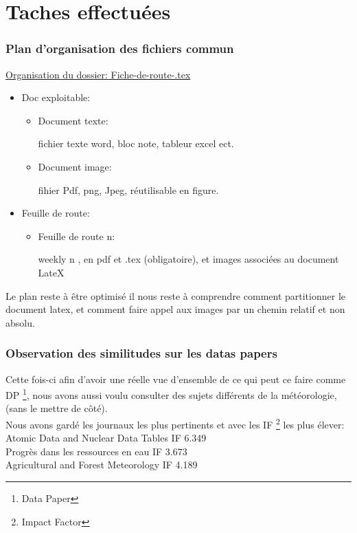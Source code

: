 \documentclass[11pt,oneside]{article}
\begin{document}
\part*{Taches effectuées}
\section*{Plan d'organisation des fichiers commun}

\underline{Organisation du dossier: Fiche-de-route-.tex}
\begin{itemize} [font=\color{airforceblue} \Large, label=, leftmargin=0cm] 
\item  Doc exploitable:	
	\begin{itemize} 
	\item Document texte:
		\begin{description}
		\item[fichier texte word, bloc note, tableur excel ect.]
		\end{description}
	\item Document image:
		\begin{description}
		\item[fihier Pdf, png, Jpeg, réutilisable en figure.]
		\end{description}
	\end{itemize}

\item Feuille de route:
	\begin{itemize}
	\item  Feuille de route n: 
		
		\begin{description}
		\item[  weekly n , en pdf et .tex (obligatoire), 					et 				images associées au document LateX ]
		\end{description}
	
	\end{itemize}
\end{itemize}
Le plan reste à être optimisé il nous reste à comprendre comment 
partitionner le document latex, et comment faire 
appel aux images par un chemin relatif et non absolu.
\newpage
\section*{Observation des similitudes sur les datas papers}
Cette fois-ci afin d'avoir une réelle vue d'ensemble de ce qui peut ce faire comme DP \footnote{Data Paper}, nous avons aussi voulu consulter des sujets
 différents de la météorologie, (sans le mettre de côté).\\
Nous avons gardé les journaux les plus pertinents et avec les IF \footnote{Impact Factor} les plus élever:\\
Atomic Data and Nuclear Data Tables IF 6.349\\
Progrès dans les ressources en eau  IF 3.673\\
Agricultural and Forest Meteorology IF 4.189\\
\end{document}
